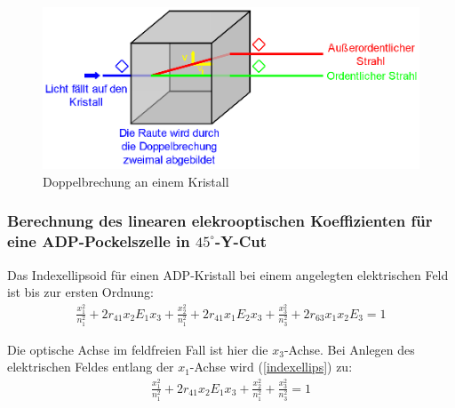\documentclass[12pt]{article}
\begin{document}
\begin{figure}[H]
\centering
\includegraphics[width=1\linewidth]{pictures/doppelbrechung.eps}
\caption{Doppelbrechung an einem Kristall}
\end{figure}

\subsubsection[Berechnung des linearen elektrooptischen Koeffizienten]{Berechnung des linearen elekrooptischen Koeffizienten für eine ADP-Pockelszelle in $45^\circ$-Y-Cut}
Das Indexellipsoid für einen ADP-Kristall bei einem angelegten elektrischen Feld ist bis zur ersten Ordnung:
\begin{align}
\label{indexellips}
 \frac{x_1^2}{n_1^2} + 2 r_{41} x_2 E_1 x_3 + \frac{x_2^2}{n_1^2} + 2 r_{41} x_1 E_2 x_3 + \frac{x_3^2}{n_3^2} + 2 r_{63} x_1 x_2 E_3 = 1
\end{align}

Die optische Achse im feldfreien Fall ist hier die $x_3$-Achse. Bei Anlegen des elektrischen Feldes entlang der $x_1$-Achse wird (\ref{indexellips}) zu:
\begin{align}
 \frac{x_1^2}{n_1^2} + 2 r_{41} x_2 E_1 x_3 + \frac{x_2^2}{n_1^2} + \frac{x_3^2}{n_3^2} = 1
\end{align}
\end{document}
